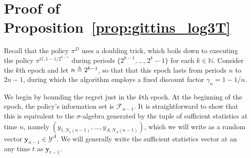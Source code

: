 \section{Proof of Proposition~\ref{prop:gittins_log3T}} \label{proof:prop_log3T}
\begin{myproof}[Proof.]
	Recall that the policy $\pi^D$ uses a doubling trick, which boils down to executing the policy $\pi^{G,1-1/2^{k-1}}$ during periods $\{2^{k-1},\ldots,2^{k}-1\}$ for each $k \in \mathbb{N}$. Consider the $k$th epoch and let $n \triangleq 2^{k-1}$, so that that this epoch lasts from periods $n$ to $2n-1$, during which the algorithm employs a fixed discount factor $\gamma_n = 1-1/n$.
	
	We begin by bounding the regret just in the $k$th epoch. At the beginning of the epoch, the policy's information set is $\mathcal F_{n-1}$. It is straightforward to show that this is equivalent to the $\sigma$-algebra generated by the tuple of sufficient statistics at time $n$, namely $(y_{1,N_1(n-1)}, \ldots, y_{A,N_A(n-1)})$, which we will write as a random vector $\mathbf y_{n-1} \in \mathcal Y^A$. We will generally write the sufficient statistics vector at an any time $t$ as $\mathbf y_{t-1}$.
	

\end{myproof}
